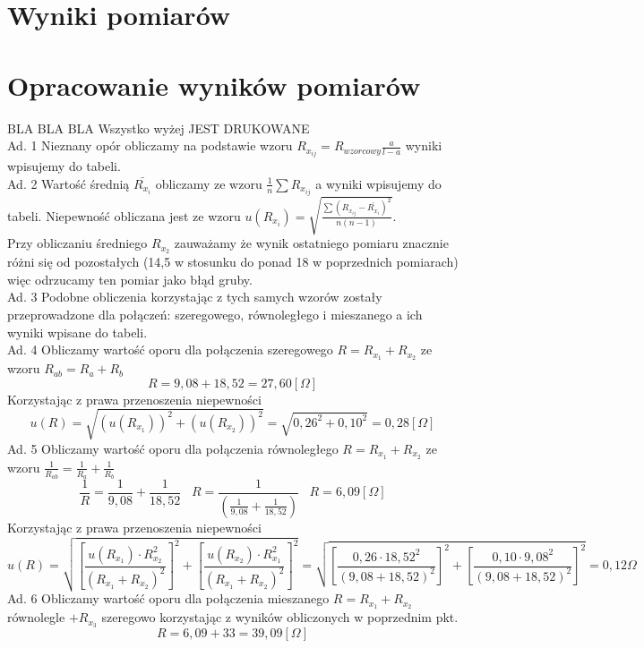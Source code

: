 \documentclass[a4paper,10pt,twoside]{article}
\begin{document}
	
	
	\section{Wyniki pomiarów}
	
	
	\section{Opracowanie wyników pomiarów}

	BLA BLA BLA Wszystko wyżej JEST DRUKOWANE
\noindent \\
	Ad. 1 Nieznany opór obliczamy na podstawie wzoru $R_{x_{ij}} = R_{wzorcowy} \frac{a}{l-a}$ wyniki wpisujemy do tabeli. \\
	Ad. 2 Wartość średnią $\bar{R_{x_i}}$ obliczamy ze wzoru $\frac{1}{n} \sum R_{x_{ij}}$ a wyniki wpisujemy do tabeli. Niepewność obliczana jest ze wzoru $u(R_{x_i}) = \sqrt{\frac{\sum(R_{x_{ij}} - \bar{R_{x_i}})^2}{n(n-1)}}$. \\ Przy obliczaniu średniego $R_{x_2}$ zauważamy że wynik ostatniego pomiaru znacznie różni się od pozostałych (14,5 w stosunku do ponad 18 w poprzednich pomiarach) więc odrzucamy ten pomiar jako błąd gruby.\\
	Ad. 3 Podobne obliczenia korzystając z tych samych wzorów zostały przeprowadzone dla połączeń: szeregowego, równoległego i mieszanego a ich wyniki wpisane do tabeli.\\
	Ad. 4 Obliczamy wartość oporu dla połączenia szeregowego $R = R_{x_1} + R_{x_2}$ ze wzoru $R_{ab} = R_a + R_b$ $$ R = 9,08 + 18,52 = 27,60[ \Omega]$$
	Korzystając z prawa przenoszenia niepewności $$u(R) =\sqrt{(u(R_{x_1}))^2 + (u(R_{x_2}))^2} = \sqrt{0,26^2 + 0,10^2} = 0,28[\Omega]$$
	Ad. 5 Obliczamy wartość oporu dla połączenia równoległego $R = R_{x_1} + R_{x_2}$ ze wzoru $\frac{1}{R_{ab}} = \frac{1}{R_a} + \frac{1}{R_b}$ $$ \frac{1}{R} = \frac{1}{9,08} + \frac{1}{18,52} \hspace{10pt} R = \frac{1}{(\frac{1}{9,08} + \frac{1}{18,52})} \hspace{10pt} R=6,09[ \Omega]$$
	Korzystając z prawa przenoszenia niepewności $$ u(R) = \sqrt{\left [\frac{u(R_{x_1})\cdot R_{x_2}^2}{(R_{x_1} + R_{x_2})^2} \right ]  ^2 + \left [\frac{u(R_{x_2})\cdot R_{x_1}^2}{(R_{x_1} + R_{x_2})^2} \right] ^2} =
	 \sqrt{\left [\frac{0,26\cdot 18,52^2}{(9,08 + 18,52)^2} \right ]  ^2 + \left [\frac{0,10\cdot 9,08^2}{(9,08 + 18,52)^2} \right] ^2} =
	  0,12\Omega$$
	Ad. 6 Obliczamy wartość oporu dla połączenia mieszanego $R = R_{x_1} + R_{x_2}$ równolegle $+ R_{x_3}$ szeregowo korzystając z wyników obliczonych w poprzednim pkt. $$R = 6,09 + 33 = 39,09[\Omega]$$
\end{document}
